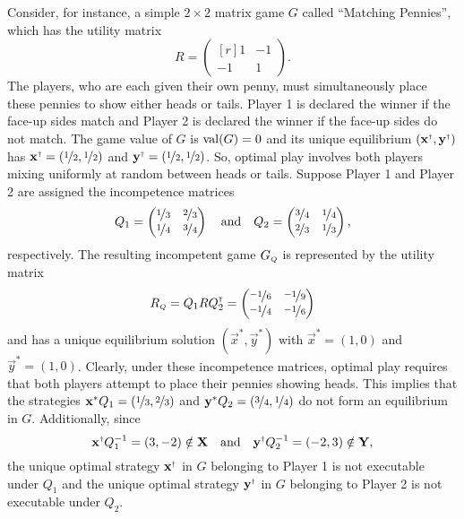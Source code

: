     Consider, for instance, a simple $2 \times 2$ matrix game $G$ called ``Matching Pennies'', which has the utility matrix
    \[
        R
            =
            \begin{pmatrix*}[r]
                1 & -1 \\
                -1 & 1
            \end{pmatrix*}.
    \]
    The players, who are each given their own penny, must simultaneously place these pennies to show either heads or tails.
    Player 1 is declared the winner if the face-up sides match and Player 2 is declared the winner if the face-up sides do not match.
    The game value of $G$ is $\val(G) = 0$ and its unique equilibrium $(\vec{x}^\sdagger, \vec{y}^\sdagger)$ has $\vec{x}^\sdagger = (\nicefrac{1}{2}, \nicefrac{1}{2})$ and $\vec{y}^\sdagger = (\nicefrac{1}{2}, \nicefrac{1}{2})$.
    So, optimal play involves both players mixing uniformly at random between heads or tails.
    Suppose Player 1 and Player 2 are assigned the incompetence matrices
    \[
        Q_1
            =
            \begin{pmatrix}
                \nicefrac{1}{3} & \nicefrac{2}{3} \\
                \nicefrac{1}{4} & \nicefrac{3}{4} \\
            \end{pmatrix}
        \quad\text{and}\quad
        Q_2
            =
            \begin{pmatrix}
                \nicefrac{3}{4} & \nicefrac{1}{4} \\
                \nicefrac{2}{3} & \nicefrac{1}{3} \\
            \end{pmatrix},
    \]
    respectively.
    The resulting incompetent game $G_\ms{Q}$ is represented by the utility matrix
    \[
        R_\ms{Q}
            = Q_1 R Q_2^\transp
            =
            \begin{pmatrix}
                \nicefrac{-1}{6} & \nicefrac{-1}{9} \\
                \nicefrac{-1}{4} & \nicefrac{-1}{6} \\
            \end{pmatrix}
    \]
    and has a unique equilibrium solution $(\vec{x}^*, \vec{y}^*)$ with $\vec{x}^* = (1, 0)$ and $\vec{y}^* = (1, 0)$.
    Clearly, under these incompetence matrices, optimal play requires that both players attempt to place their pennies showing heads.
    This implies that the strategies $\vec{x}^* Q_1 = (\nicefrac{1}{3}, \nicefrac{2}{3})$ and $\vec{y}^* Q_2 = (\nicefrac{3}{4}, \nicefrac{1}{4})$ do not form an equilibrium in $G$.
    Additionally, since
    \[
        \vec{x}^\sdagger Q_1^{-1}
            = (3, -2)
            \notin \vec{X}
        \quad\text{and}\quad
        \vec{y}^\sdagger Q_2^{-1}
            = (-2, 3)
            \notin \vec{Y},
    \]
    the unique optimal strategy $\vec{x}^\sdagger$ in $G$ belonging to Player 1 is not executable under $Q_1$ and the unique optimal strategy $\vec{y}^\sdagger$ in $G$ belonging to Player 2 is not executable under $Q_2$.

